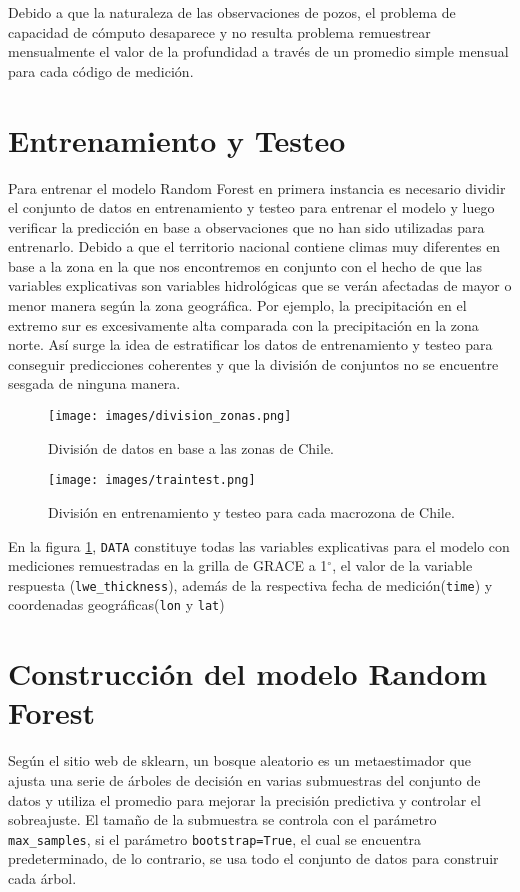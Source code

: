     Debido a que la naturaleza de las observaciones de pozos, el problema de capacidad de cómputo desaparece y no resulta problema remuestrear mensualmente el valor de la profundidad a través de 
    un promedio simple mensual para cada código de medición.
%   
%
%
%
%
%
%
\section{Entrenamiento y Testeo}
    Para entrenar el modelo Random Forest en primera instancia es necesario dividir el conjunto de datos en entrenamiento
    y testeo para entrenar el modelo y luego verificar la predicción en base a observaciones que no han sido utilizadas para 
    entrenarlo. Debido a que el territorio nacional contiene climas muy diferentes en base a la zona en la que nos encontremos
    en conjunto con el hecho de que las variables explicativas son variables hidrológicas que se verán afectadas de mayor o menor manera
    según la zona geográfica. Por ejemplo, la precipitación en el extremo sur es excesivamente alta comparada con la precipitación en 
    la zona norte. Así surge la idea de estratificar los datos de entrenamiento y testeo para conseguir predicciones coherentes 
    y que la división de conjuntos no se encuentre sesgada de ninguna manera.
    \begin{figure}[H]
        \centering
              \texttt{[image: images/division\_zonas.png]}
              \vskip -0.1in
        \caption[División de datos por macrozonas de Chile]{\footnotesize División de datos en base a las zonas de Chile.}
        \label{division}
    \end{figure}

    \begin{figure}[H]
        \centering
            \texttt{[image: images/traintest.png]}
              \vskip -0.1in
        \caption[Entrenamiento y testeo mediante macrozonas]{\footnotesize División en entrenamiento y testeo para cada macrozona de Chile.}
        \label{traintest}
    \end{figure}

    En la figura \ref{division}, \texttt{DATA} constituye todas las variables explicativas para el modelo con mediciones remuestradas en la grilla de GRACE
    a 1$^{\circ}$, el valor de la variable respuesta (\texttt{lwe\_thickness}), además de la respectiva fecha de medición(\texttt{time}) y 
    coordenadas geográficas(\texttt{lon} y \texttt{lat})
%
%
%
%
\section{Construcción del modelo Random Forest}
Según el sitio web de sklearn\cite{rfskl}, un bosque aleatorio es un metaestimador 
que ajusta una serie de árboles de decisión en varias submuestras 
del conjunto de datos y utiliza el promedio para mejorar la precisión predictiva y controlar el sobreajuste. 
El tamaño de la submuestra se controla con el parámetro \texttt{max\_samples}, si el parámetro \texttt{bootstrap=True}, el cual se encuentra predeterminado, 
de lo contrario, se usa todo el conjunto de datos para construir cada árbol.

